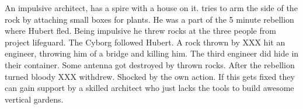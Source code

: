 \begin{npcBox}[title=Name]
    \begin{consequences}
    \item {}
    \item {}
    \item {}
    \end{consequences}
    
    \begin{npcDescription}
    An impulsive architect, has a spire with a house on it. tries to arm the side of the rock by attaching small boxes for plants.
    He was a part of the 5 minute rebellion where Hubert fled. Being impulsive he threw rocks at the three people from project lifeguard. The Cyborg followed Hubert. A rock thrown by XXX hit an engineer, throwing him of a bridge and killing him. The third engineer did hide in their container. Some antenna got destroyed by thrown rocks.
    After the rebellion turned bloody XXX withdrew. Shocked by the own action.
    If this gets fixed they can gain support by a skilled architect who just lacks the tools to build awesome vertical gardens.
    \end{npcDescription}
    
\end{npcBox}



